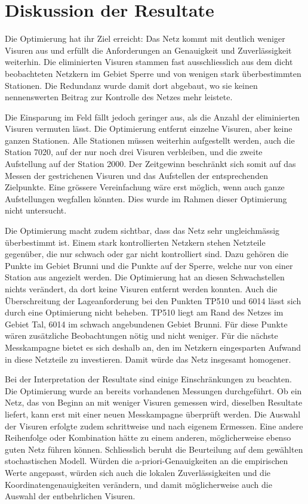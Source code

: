 \section{Diskussion der Resultate}
\label{sec:resultate}

Die Optimierung hat ihr Ziel erreicht: Das Netz kommt mit deutlich weniger Visuren aus und erfüllt die Anforderungen
an Genauigkeit und Zuverlässigkeit weiterhin. Die eliminierten Visuren stammen fast ausschliesslich aus dem dicht
beobachteten Netzkern im Gebiet Sperre und von wenigen stark überbestimmten Stationen. Die Redundanz wurde damit
dort abgebaut, wo sie keinen nennenswerten Beitrag zur Kontrolle des Netzes mehr leistete.
\bigskip

Die Einsparung im Feld fällt jedoch geringer aus, als die Anzahl der eliminierten Visuren vermuten lässt. Die
Optimierung entfernt einzelne Visuren, aber keine ganzen Stationen. Alle Stationen müssen weiterhin aufgestellt
werden, auch die Station 7020, auf der nur noch drei Visuren verbleiben, und die zweite Aufstellung auf der
Station 2000. Der Zeitgewinn beschränkt sich somit auf das Messen der gestrichenen Visuren und das Aufstellen der
entsprechenden Zielpunkte. Eine grössere Vereinfachung wäre erst möglich, wenn auch ganze Aufstellungen wegfallen
könnten. Dies wurde im Rahmen dieser Optimierung nicht untersucht.
\bigskip

Die Optimierung macht zudem sichtbar, dass das Netz sehr ungleichmässig überbestimmt ist. Einem stark
kontrollierten Netzkern stehen Netzteile gegenüber, die nur schwach oder gar nicht kontrolliert sind. Dazu gehören
die Punkte im Gebiet Brunni und die Punkte auf der Sperre, welche nur von einer Station aus angezielt werden. Die
Optimierung hat an diesen Schwachstellen nichts verändert, da dort keine Visuren entfernt werden konnten. Auch die
Überschreitung der Lageanforderung bei den Punkten TP510 und 6014 lässt sich durch eine Optimierung nicht beheben.
TP510 liegt am Rand des Netzes im Gebiet Tal, 6014 im schwach angebundenen Gebiet Brunni. Für diese Punkte wären
zusätzliche Beobachtungen nötig und nicht weniger. Für die nächste Messkampagne bietet es sich deshalb an, den
im Netzkern eingesparten Aufwand in diese Netzteile zu investieren. Damit würde das Netz insgesamt homogener.
\bigskip

Bei der Interpretation der Resultate sind einige Einschränkungen zu beachten. Die Optimierung wurde an bereits
vorhandenen Messungen durchgeführt. Ob ein Netz, das von Beginn an mit weniger Visuren gemessen wird, dieselben
Resultate liefert, kann erst mit einer neuen Messkampagne überprüft werden. Die Auswahl der Visuren erfolgte zudem
schrittweise und nach eigenem Ermessen. Eine andere Reihenfolge oder Kombination hätte zu einem anderen, möglicherweise
ebenso guten Netz führen können. Schliesslich beruht die Beurteilung auf dem gewählten stochastischen Modell. Würden
die a-priori-Genauigkeiten an die empirischen Werte angepasst, würden sich auch die lokalen Zuverlässigkeiten und
die Koordinatengenauigkeiten verändern, und damit möglicherweise auch die Auswahl der entbehrlichen Visuren.
\bigskip

